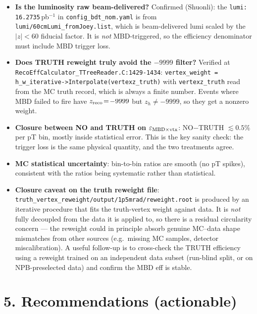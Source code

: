 \documentclass[11pt,a4paper]{article}
\begin{document}
\begin{itemize}
\item \textbf{Is the luminosity raw beam-delivered?} Confirmed (Shuonli): the \texttt{lumi: 16.2735}\,pb$^{-1}$ in \texttt{config\_bdt\_nom.yaml} is from \texttt{lumi/60cmLumi\_fromJoey.list}, which is beam-delivered lumi scaled by the $|z|<60$ fiducial factor. It is \emph{not} MBD-triggered, so the efficiency denominator must include MBD trigger loss.
\item \textbf{Does TRUTH reweight truly avoid the $-9999$ filter?} Verified at \texttt{RecoEffCalculator\_TTreeReader.C:1429-1434}: \texttt{vertex\_weight = h\_w\_iterative->Interpolate(vertexz\_truth)} with \texttt{vertexz\_truth} read from the MC truth record, which is always a finite number. Events where MBD failed to fire have $z_{\rm reco}\!=\!-9999$ but $z_h\neq-9999$, so they get a nonzero weight.
\item \textbf{Closure between NO and TRUTH on $\varepsilon_{\rm MBD\times vtx}$}: NO$-$TRUTH $\lesssim 0.5\%$ per pT bin, mostly inside statistical error. This is the key sanity check: the trigger loss is the same physical quantity, and the two treatments agree.
\item \textbf{MC statistical uncertainty}: bin-to-bin ratios are smooth (no pT spikes), consistent with the ratios being systematic rather than statistical.
\item \textbf{Closure caveat on the truth reweight file}: \texttt{truth\_vertex\_reweight/output/1p5mrad/reweight.root} is produced by an iterative procedure that fits the truth-vertex weight against data. It is \emph{not} fully decoupled from the data it is applied to, so there is a residual circularity concern — the reweight could in principle absorb genuine MC--data shape mismatches from other sources (e.g.\ missing MC samples, detector miscalibration). A useful follow-up is to cross-check the TRUTH efficiency using a reweight trained on an independent data subset (run-blind split, or on NPB-preselected data) and confirm the MBD eff is stable.
\end{itemize}

\section*{5. Recommendations (actionable)}
\end{document}
